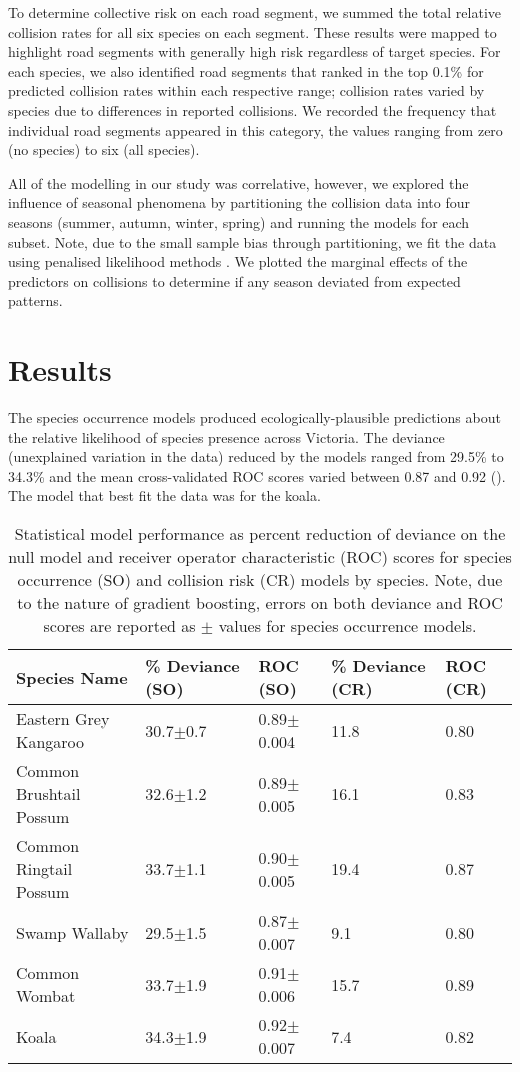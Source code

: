 To determine collective risk on each road segment, we summed the total relative collision rates for all six species on each segment.  These results were mapped to highlight road segments with generally high risk regardless of target species. For each species, we also identified road segments that ranked in the top 0.1\% for predicted collision rates within each respective range; collision rates varied by species due to differences in reported collisions. We recorded the frequency that individual road segments appeared in this category, the values ranging from zero (no species) to six (all species).

All of the modelling in our study was correlative, however, we explored the influence of seasonal phenomena by partitioning the collision data into four seasons (summer, autumn, winter, spring) and running the models for each subset. Note, due to the small sample bias through partitioning, we fit the data using penalised likelihood methods \citep[see][]{firt93}.  We plotted the marginal effects of the predictors on collisions to determine if any season deviated from expected patterns.

\section{Results}

The species occurrence models produced ecologically-plausible predictions about the relative likelihood of species presence across Victoria. The deviance (unexplained variation in the data) reduced by the models ranged from 29.5\% to 34.3\% and the mean cross-validated ROC scores varied between 0.87 and 0.92 (). The model that best fit the data was for the koala. 

\begin{table}[!t]
\caption[Statistical model performance for six mammal species]{Statistical model performance as percent reduction of deviance on the null model and receiver operator characteristic (ROC) scores for species occurrence (SO) and collision risk (CR) models by species. Note, due to the nature of gradient boosting, errors on both deviance and ROC scores are reported as $\pm$ values for species occurrence models.}
\centering
\begin{tabularx}{0.9\textwidth}{lllll} \toprule
Species Name			&\% Deviance (SO)	&ROC (SO)			&\% Deviance (CR)	&ROC (CR)\\
\midrule 
Eastern Grey Kangaroo	& 30.7$\pm$0.7 		& 0.89$\pm$0.004	& 11.8 				& 0.80 \\ 
Common Brushtail Possum & 32.6$\pm$1.2 		& 0.89$\pm$0.005 	& 16.1 				& 0.83 \\ 
Common Ringtail Possum 	& 33.7$\pm$1.1 		& 0.90$\pm$0.005 	& 19.4 				& 0.87 \\ 
Swamp Wallaby		 	& 29.5$\pm$1.5 		& 0.87$\pm$0.007 	& 9.1 				& 0.80 \\ 
Common Wombat 			& 33.7$\pm$1.9 		& 0.91$\pm$0.006 	& 15.7 				& 0.89 \\ 
Koala 					& 34.3$\pm$1.9 		& 0.92$\pm$0.007 	& 7.4 				& 0.82 \\ 
\bottomrule
\end{tabularx}
\label{6sp_models}
\end{table}


